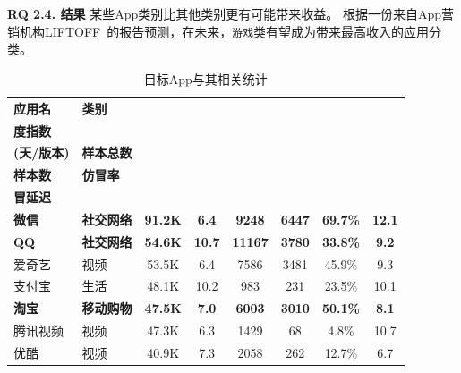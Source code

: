 {\bf RQ 2.4. 结果}
某些App类别比其他类别更有可能带来收益。
根据一份来自App营销机构LIFTOFF~\cite{LIFTOFF_report}的报告预测，在未来，\texttt{游戏}类有望成为带来最高收入的应用分类。

\begin{ThreePartTable}
\centering
\renewcommand{\arraystretch}{1.05}
\footnotesize
\setlength{\belowcaptionskip}{-5pt}
\vspace{1mm}
\begin{longtable}{l l c c c c c c}
\caption{目标App与其相关统计}\label{table:data-statistics}\\
\toprule
{\bf 应用名} & {\bf 类别} & \begin{tabular}[c]{@{}c@{}}{\bf 月度热} \\ {\bf 度指数} \end{tabular} & \begin{tabular}[c]{@{}c@{}}{\bf 更新频率} \\ {\bf (天/版本)} \end{tabular} & {\bf 样本总数} & \begin{tabular}[c]{@{}c@{}}{\bf 仿冒} \\ {\bf 样本数} \end{tabular} & {\bf 仿冒率} & \begin{tabular}[c]{@{}c@{}}{\bf 平均仿} \\ {\bf 冒延迟} \end{tabular} \\
\midrule
{\bf 微信}\tnote{*} & {\bf 社交网络} & {\bf 91.2K} & {\bf 6.4} & {\bf 9248} & {\bf 6447} & {\bf 69.7\%} & {\bf 12.1} \\
\rowcolor{gray!15} {\bf QQ}\tnote{*} & {\bf 社交网络} & {\bf 54.6K} & {\bf 10.7} & {\bf 11167} & {\bf 3780} & {\bf 33.8\%} & {\bf 9.2} \\
爱奇艺 & 视频 & 53.5K & 6.4 & 7586 & 3481 & 45.9\% & 9.3 \\
\rowcolor{gray!15} 支付宝 & 生活 & 48.1K & 10.2 & 983 & 231 & 23.5\% & 10.1 \\
{\bf 淘宝}\tnote{*} & {\bf 移动购物} & {\bf 47.5K} & {\bf 7.0} & {\bf 6003} & {\bf 3010} & {\bf 50.1\%} & {\bf 8.1} \\
\rowcolor{gray!15} 腾讯视频 & 视频 & 47.3K & 6.3 & 1429 & 68 & 4.8\% & 10.7 \\
优酷 & 视频 & 40.9K & 7.3 & 2058 & 262 & 12.7\% & 6.7 \\

\end{longtable}
\end{ThreePartTable}
